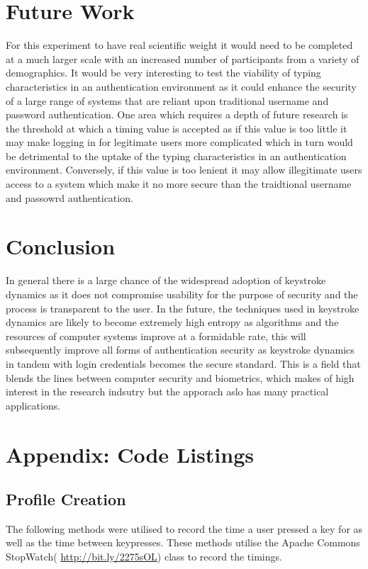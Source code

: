 \documentclass{article}
\begin{document}
\section{Future Work}
For this experiment to have real scientific weight it would need to be completed at a much larger scale with an increased number of participants from a variety of demographics. It would be very interesting to test the viability of typing characteristics in an authentication environment as it could enhance the security of a large range of systems that are reliant upon traditional username and password authentication. One area which requires a depth of future research is the threshold at which a timing value is accepted as if this value is too little it may make logging in for legitimate users more complicated which in turn would be detrimental to the uptake of the typing characteristics in an authentication environment. Conversely, if this value is too lenient it may allow illegitimate users access to a system which make it no more secure than the traidtional username and passowrd authentication. 

\section{Conclusion}

In general there is a large chance of the widespread adoption of keystroke dynamics as it does not compromise usability for the purpose of security and the process is transparent to the user. In the future, the techniques used in keystroke dynamics are likely to become extremely high entropy as algorithms and the resources of computer systems improve at a formidable rate, this will subsequently improve all forms of authentication security as keystroke dynamics in tandem with login credentials becomes the secure standard. This is a field that blends the lines between computer security and biometrics, which makes of high interest in the research indsutry but the apporach aslo has many practical applications.  

\section{Appendix: Code Listings} \label{appendix}

\subsection{Profile Creation}
The following methods were utilised to record the time a user pressed a key for as well as the time between keypresses. These methods utilise the Apache Commons StopWatch( \url{http://bit.ly/2275sOL}) class to record the timings.  
\end{document}
